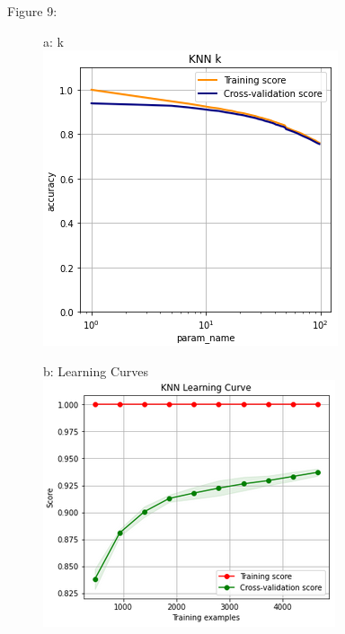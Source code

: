 \documentclass{article}
\begin{document}
\begin{figure}
	\centering
	Figure 9:\\
	\begin{subfigure}{.30\textwidth}
		\centering
		a: k\\
		\includegraphics[width=\linewidth]{mnist_knn_k.png}
		
	\end{subfigure}
	\begin{subfigure}{.34\textwidth}
		\centering
		b: Learning Curves\\
		\includegraphics[width=\linewidth]{mnist_knn_learning.png}
		

\end{subfigure}
\end{figure}
\end{document}
